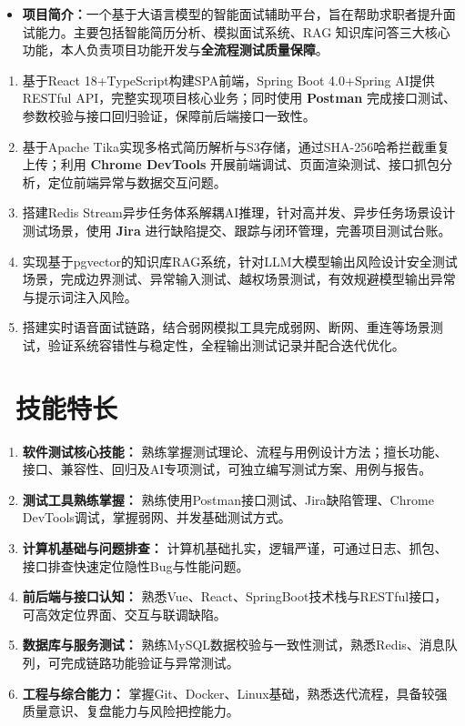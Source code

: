 ﻿\documentclass[10pt,a4paper]{ctexart}
\newcommand{\sect}[2]{%
  \section{\texorpdfstring{\makebox[\widthof{\faGraduationCap}][c]{{\mdseries\color{themecolor}#1}}\ #2}{#2}}
}
\begin{document}
\begin{itemize}
  \item \textbf{项目简介：}一个基于大语言模型的智能面试辅助平台，旨在帮助求职者提升面试能力。主要包括智能简历分析、模拟面试系统、RAG 知识库问答三大核心功能，本人负责项目功能开发与\textbf{全流程测试质量保障}。
\end{itemize}
\begin{enumerate}
  \item 基于React 18+TypeScript构建SPA前端，Spring Boot 4.0+Spring AI提供RESTful API，完整实现项目核心业务；同时使用 \textbf{Postman} 完成接口测试、参数校验与接口回归验证，保障前后端接口一致性。
  \item 基于Apache Tika实现多格式简历解析与S3存储，通过SHA-256哈希拦截重复上传；利用 \textbf{Chrome DevTools} 开展前端调试、页面渲染测试、接口抓包分析，定位前端异常与数据交互问题。
  \item 搭建Redis Stream异步任务体系解耦AI推理，针对高并发、异步任务场景设计测试场景，使用 \textbf{Jira} 进行缺陷提交、跟踪与闭环管理，完善项目测试台账。
  \item 实现基于pgvector的知识库RAG系统，针对LLM大模型输出风险设计安全测试场景，完成边界测试、异常输入测试、越权场景测试，有效规避模型输出异常与提示词注入风险。
  \item 搭建实时语音面试链路，结合弱网模拟工具完成弱网、断网、重连等场景测试，验证系统容错性与稳定性，全程输出测试记录并配合迭代优化。
\end{enumerate}

\sect{\faWrench}{技能特长}
\begin{enumerate}
  \item \textbf{软件测试核心技能：} 熟练掌握测试理论、流程与用例设计方法；擅长功能、接口、兼容性、回归及AI专项测试，可独立编写测试方案、用例与报告。
  \item \textbf{测试工具熟练掌握：} 熟练使用Postman接口测试、Jira缺陷管理、Chrome DevTools调试，掌握弱网、并发基础测试方式。
  \item \textbf{计算机基础与问题排查：} 计算机基础扎实，逻辑严谨，可通过日志、抓包、接口排查快速定位隐性Bug与性能问题。
  \item \textbf{前后端与接口认知：} 熟悉Vue、React、SpringBoot技术栈与RESTful接口，可高效定位界面、交互与联调缺陷。
  \item \textbf{数据库与服务测试：} 熟练MySQL数据校验与一致性测试，熟悉Redis、消息队列，可完成链路功能验证与异常测试。
  \item \textbf{工程与综合能力：} 掌握Git、Docker、Linux基础，熟悉迭代流程，具备较强质量意识、复盘能力与风险把控能力。
\end{enumerate}
\end{document}

